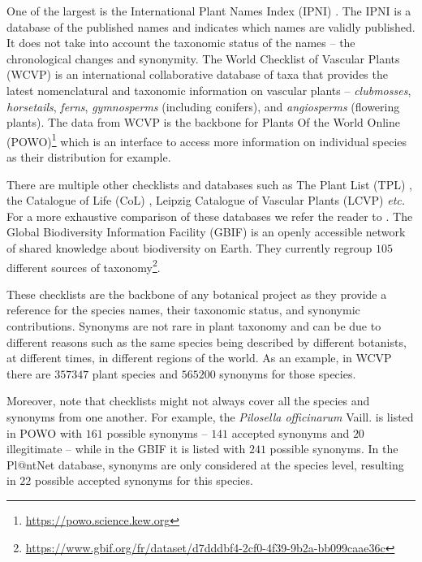 One of the largest is the International Plant Names Index (IPNI) \citep{IPNI2024}.
The IPNI is a database of the published names and indicates which names are validly published.
It does not take into account the taxonomic status of the names -- the chronological changes and synonymity.
The World Checklist of Vascular Plants (WCVP) \citep{govaerts2021world} is an international collaborative database of taxa that provides the latest nomenclatural and taxonomic information on vascular plants -- \emph{clubmosses}, \emph{horsetails}, \emph{ferns}, \emph{gymnosperms} (including conifers), and \emph{angiosperms} (flowering plants).
The data from WCVP is the backbone for Plants Of the World Online (POWO)\footnote{\url{https://powo.science.kew.org}} which is an interface to access more information on individual species as their distribution for example.

There are multiple other checklists and databases such as The Plant List (TPL) \citep{PlantList2013}, the Catalogue of Life (CoL) \citep{cachuela2006towards}, Leipzig Catalogue of Vascular Plants (LCVP) \citep{freiberg2020leipzig} \emph{etc.} For a more exhaustive comparison of these databases we refer the reader to \citet{schellenberger2023big}.
The Global Biodiversity Information Facility (GBIF) \citep{telenius2011biodiversity} is an openly accessible network of shared knowledge about biodiversity on Earth.
They currently regroup $105$ different sources of taxonomy\footnote{\url{https://www.gbif.org/fr/dataset/d7dddbf4-2cf0-4f39-9b2a-bb099caae36c}}.

These checklists are the backbone of any botanical project as they provide a reference for the species names, their taxonomic status, and synonymic contributions.
Synonyms are not rare in plant taxonomy and can be due to different reasons such as the same species being described by different botanists, at different times, in different regions of the world.
As an example, in WCVP there are $\num{357347}$ plant species and $\num{565200}$ synonyms for those species.

Moreover, note that checklists might not always cover all the species and synonyms from one another.
For example, the \emph{Pilosella officinarum} Vaill. is listed in POWO with $161$ possible synonyms  -- $141$ accepted synonyms and $20$ illegitimate -- while in the GBIF it is listed with $241$ possible synonyms.
In the Pl@ntNet database, synonyms are only considered at the species level, resulting in $22$ possible accepted synonyms for this species.

